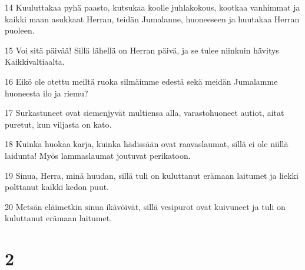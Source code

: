 \par 14 Kuuluttakaa pyhä paasto, kutsukaa koolle juhlakokous, kootkaa vanhimmat ja kaikki maan asukkaat Herran, teidän Jumalanne, huoneeseen ja huutakaa Herran puoleen.
\par 15 Voi sitä päivää! Sillä lähellä on Herran päivä, ja se tulee niinkuin hävitys Kaikkivaltiaalta.
\par 16 Eikö ole otettu meiltä ruoka silmäimme edestä sekä meidän Jumalamme huoneesta ilo ja riemu?
\par 17 Surkastuneet ovat siemenjyvät multiensa alla, varastohuoneet autiot, aitat puretut, kun viljasta on kato.
\par 18 Kuinka huokaa karja, kuinka hädissään ovat raavaslaumat, sillä ei ole niillä laidunta! Myös lammaslaumat joutuvat perikatoon.
\par 19 Sinua, Herra, minä huudan, sillä tuli on kuluttanut erämaan laitumet ja liekki polttanut kaikki kedon puut.
\par 20 Metsän eläimetkin sinua ikävöivät, sillä vesipurot ovat kuivuneet ja tuli on kuluttanut erämaan laitumet.

\chapter{2}

